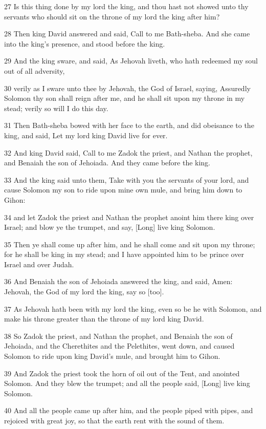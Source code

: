 \par 27 Is this thing done by my lord the king, and thou hast not showed unto thy servants who should sit on the throne of my lord the king after him?
\par 28 Then king David answered and said, Call to me Bath-sheba. And she came into the king's presence, and stood before the king.
\par 29 And the king sware, and said, As Jehovah liveth, who hath redeemed my soul out of all adversity,
\par 30 verily as I sware unto thee by Jehovah, the God of Israel, saying, Assuredly Solomon thy son shall reign after me, and he shall sit upon my throne in my stead; verily so will I do this day.
\par 31 Then Bath-sheba bowed with her face to the earth, and did obeisance to the king, and said, Let my lord king David live for ever.
\par 32 And king David said, Call to me Zadok the priest, and Nathan the prophet, and Benaiah the son of Jehoiada. And they came before the king.
\par 33 And the king said unto them, Take with you the servants of your lord, and cause Solomon my son to ride upon mine own mule, and bring him down to Gihon:
\par 34 and let Zadok the priest and Nathan the prophet anoint him there king over Israel; and blow ye the trumpet, and say, [Long] live king Solomon.
\par 35 Then ye shall come up after him, and he shall come and sit upon my throne; for he shall be king in my stead; and I have appointed him to be prince over Israel and over Judah.
\par 36 And Benaiah the son of Jehoiada answered the king, and said, Amen: Jehovah, the God of my lord the king, say so [too].
\par 37 As Jehovah hath been with my lord the king, even so be he with Solomon, and make his throne greater than the throne of my lord king David.
\par 38 So Zadok the priest, and Nathan the prophet, and Benaiah the son of Jehoiada, and the Cherethites and the Pelethites, went down, and caused Solomon to ride upon king David's mule, and brought him to Gihon.
\par 39 And Zadok the priest took the horn of oil out of the Tent, and anointed Solomon. And they blew the trumpet; and all the people said, [Long] live king Solomon.
\par 40 And all the people came up after him, and the people piped with pipes, and rejoiced with great joy, so that the earth rent with the sound of them.
